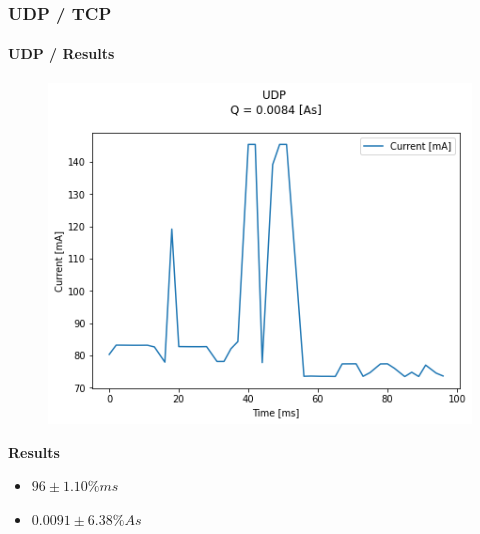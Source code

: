 \begin{frame}
	\frametitle{UDP / TCP}
	\framesubtitle{UDP / Results}
	\begin{minipage}[c]{0.50 \textwidth}
		\begin{figure}[H]
			\centering
			\includegraphics[width = 0.9 \linewidth]{fig/UDP_TCP/udp_s_o.png}
		\end{figure}
	\end{minipage}
	\begin{minipage}[r]{0.40 \textwidth}
		\vspace{-80pt}
		\textbf{Results}\linebreak
		\begin{itemize}
			\item $96\pm1.10\%ms$
			\item $0.0091\pm6.38\%As$
		\end{itemize}
	\end{minipage}
\end{frame}
